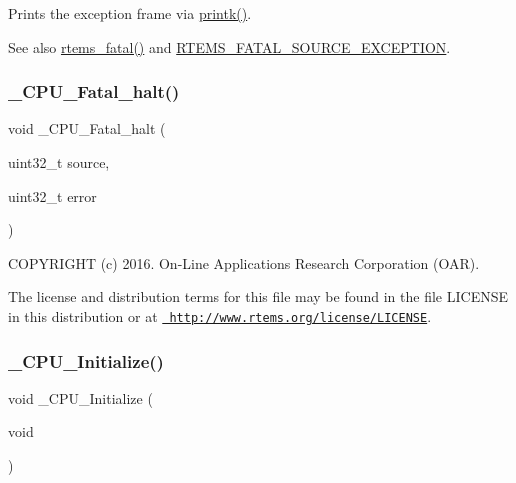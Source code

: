 Prints the exception frame via \mbox{\hyperlink{bspIo_8h_a380cfecc8035cec8a13b68c0cb90f32f}{printk()}}. 

\begin{DoxySeeAlso}{See also}
\mbox{\hyperlink{group__ClassicFatal_ga53fa9338246642e0d931f61314c6609e}{rtems\+\_\+fatal()}} and \mbox{\hyperlink{group__RTEMSScoreIntErr_gga878b4de77df7d0b83d19609d4de42c26a131fe6aad46a1394f8bb0f2a5f19fa05}{R\+T\+E\+M\+S\+\_\+\+F\+A\+T\+A\+L\+\_\+\+S\+O\+U\+R\+C\+E\+\_\+\+E\+X\+C\+E\+P\+T\+I\+ON}}. 
\end{DoxySeeAlso}
\mbox{\label{group__RTEMSScoreCPUi386_ga254ab76f1c02812babdb3d5028f59178}} 
\subsubsection{\texorpdfstring{\_CPU\_Fatal\_halt()}{\_CPU\_Fatal\_halt()}}
{\footnotesize\ttfamily void \+\_\+\+C\+P\+U\+\_\+\+Fatal\+\_\+halt (\begin{DoxyParamCaption}\item[{uint32\+\_\+t}]{source,  }\item[{uint32\+\_\+t}]{error }\end{DoxyParamCaption})}

C\+O\+P\+Y\+R\+I\+G\+HT (c) 2016. On-\/\+Line Applications Research Corporation (O\+AR).

The license and distribution terms for this file may be found in the file L\+I\+C\+E\+N\+SE in this distribution or at \href{http://www.rtems.org/license/LICENSE}{\texttt{ http\+://www.\+rtems.\+org/license/\+L\+I\+C\+E\+N\+SE}}. \mbox{\label{group__RTEMSScoreCPUi386_ga869484e3d851b032fd826c69ff21fc72}} 
\subsubsection{\texorpdfstring{\_CPU\_Initialize()}{\_CPU\_Initialize()}}
{\footnotesize\ttfamily void \+\_\+\+C\+P\+U\+\_\+\+Initialize (\begin{DoxyParamCaption}\item[{void}]{ }\end{DoxyParamCaption})}



